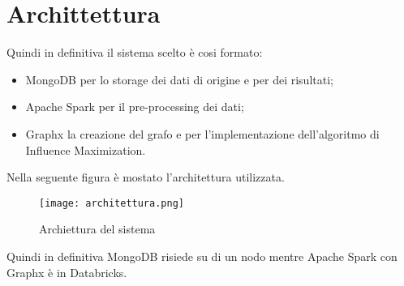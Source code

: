 \clearpage

\section{Archittettura}
Quindi in definitiva il sistema scelto è cosi formato:
\begin{itemize}
	\item MongoDB per lo storage dei dati di origine e per dei risultati;
	\item Apache Spark per il pre-processing dei dati;
	\item Graphx la creazione del grafo e per l'implementazione dell'algoritmo di Influence
	Maximization.
\end{itemize}
Nella seguente figura è mostato l'architettura utilizzata.
\begin{figure}[!htbp]
	\texttt{[image: architettura.png]}
  \caption{Archiettura del sistema}
  \label{sysarch}
\end{figure}
Quindi in definitiva MongoDB risiede su di un nodo mentre Apache Spark con Graphx
è in Databricks.
